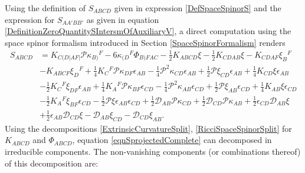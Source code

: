 \documentclass[10pt,a4paper]{article}
\theoremstyle{plain}
\begin{document}
Using the definition of $S_{ABCD}$ given in expression
\eqref{DefSpaceSpinorS} and the expression for $S_{AA'BB'}$ as given
in equation \eqref{DefinitionZeroQuantitySIntersmOfAuxiliaryV}, a
direct computation using the space spinor formalism introduced in
Section \ref{SpaceSpinorFormalism} renders
\begin{align}
\label{eqnSprojectedComplete}
 S_{ABCD} &= K_{C(D|AF|}\mathcal{P}\kappa_{B)}{}^{F}-6
 \kappa_{(D}{}^{F} \Phi_{B)FAC} - \tfrac{1}{2} K_ {ABCD} \xi -
 \tfrac{1}{2} K_ {CDAB} \xi - K_{CDAF} \xi_{B}{}^{F} \nonumber \\ &
 -K_{ABCF} \xi_{D}{}^{F} +\tfrac{1}{4}
 K_{C}{}^{F}\mathcal{P}\kappa_{DF}\epsilon_{AB} - \tfrac{1}{4}
 \mathcal{P}^2 \kappa_{CD} \epsilon_{AB} +
 \tfrac{1}{2}\mathcal{P}\xi_{CD} \epsilon_{AB} + \tfrac{1}{4} K_ {CD}
 \xi \epsilon_{AB} \nonumber \\ & - \tfrac{1}{2} K_{C}{}^{F} \xi_{DF}
 \epsilon_{AB} + \tfrac{1}{4} K_{A}{}^{F}
 \mathcal{P}\kappa_{BF}\epsilon_{CD} - \tfrac{1}{4} \mathcal{P}^2
 \kappa_{AB} \epsilon_{CD} + \tfrac{1}{2}\mathcal{P}\xi_{AB}
 \epsilon_{CD} + \tfrac{1}{4} K_{AB} \xi \epsilon_{CD} \nonumber \\ &
 - \tfrac{1}{2} K_{A}{}^{F} \xi_{BF} \epsilon_{CD}
 -\tfrac{1}{2}\mathcal{P}\xi \epsilon_{AB}\epsilon_{CD} +
 \tfrac{1}{2}\mathcal{D}_{AB}\mathcal{P}\kappa_{CD}+
 \tfrac{1}{2}\mathcal{D}_{CD}\mathcal{P}\kappa_{AB}
 +\tfrac{1}{2}\epsilon_{CD}\mathcal{D}_{AB}\xi \nonumber \\ & +
 \tfrac{1}{2}\epsilon_{AB}\mathcal{D}_{CD}\xi
 -\mathcal{D}_{AB}\xi_{CD}-\mathcal{D}_{CD}\xi_{AB}.
\end{align}
Using the decompositions \eqref{ExtrinsicCurvatureSplit},
\eqref{RicciSpaceSpinorSplit} for $K_{ABCD}$ and $\Phi_{ABCD}$,
equation \eqref{eqnSprojectedComplete} can decomposed in irreducible
components. The non-vanishing components (or combinations thereof) of
this decomposition are:
\end{document}
